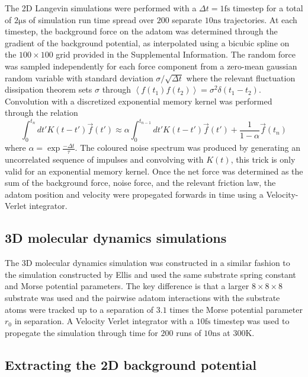 \documentclass[7pt]{article}
\newcommand{\ns}{\si{\nano\second}}
\newcommand{\fs}{\si{\femto\second}}
\newcommand{\us}{\si{\micro\second}}
\newcommand{\K}{\si{\kelvin}}
\begin{document}
The 2D Langevin simulations were performed with a $\Delta{t} = 1\fs$ timestep for a total of $2\us$ of simulation run time spread over $200$ separate $10\ns$ trajectories. At each timestep, the background force on the adatom was determined through the gradient of the background potential, as interpolated using a bicubic spline on the $100\times100$ grid provided in the Supplemental Information. The random force was sampled independently for each force component from a zero-mean gaussian random variable with standard deviation $\sigma/\sqrt{\Delta{t}}$ where the relevant fluctuation dissipation theorem sets $\sigma$ through $\left<f\left(t_1\right)f\left(t_2\right)\right>=\sigma^2\delta\left(t_1-t_2\right)$. Convolution with a discretized exponential memory kernel was performed through the relation
$$
\int_0^{t_n} dt' K\left(t-t'\right) \vec{f}(t') \approx \alpha \int_0^{t_{n-1}} dt' K\left(t-t'\right) \vec{f}(t') + \frac{1}{1-\alpha} \vec{f}\left(t_n\right)
$$
where $\alpha = \exp{\frac{-\Delta{t}}{\tau}}$. The coloured noise spectrum was produced by generating an uncorrelated sequence of impulses and convolving with $K(t)$, this trick is only valid for an exponential memory kernel. Once the net force was determined as the sum of the background force, noise force, and the relevant friction law, the adatom position and velocity were propegated forwards in time using a Velocity-Verlet integrator\cite{Verlet}.

\subsection*{3D molecular dynamics simulations}

The 3D molecular dynamics simulation was constructed in a similar fashion to the simulation constructed by Ellis\cite{Ellis} and used the same substrate spring constant and Morse potential parameters. The key difference is that a larger $8\times8\times8$ substrate was used and the pairwise adatom interactions with the substrate atoms were tracked up to a separation of $3.1$ times the Morse potential parameter $r_0$ in separation. A Velocity Verlet integrator\cite{Verlet} with a $10\fs$ timestep was used to propegate the simulation through time for $200$ runs of $10\ns$ at $300\K$.

\subsection*{Extracting the 2D background potential}
\end{document}
